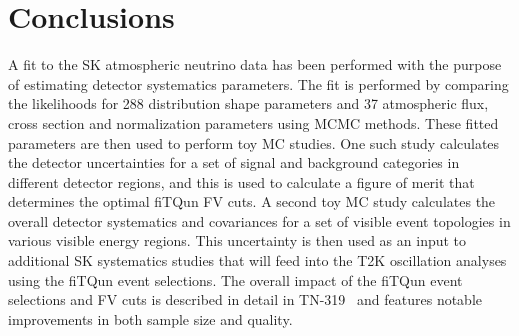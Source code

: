 
\section{Conclusions}
\label{sec:conclusions}

A fit to the SK atmospheric neutrino data has been performed with the purpose
of estimating detector systematics parameters.  The fit is performed by
comparing the likelihoods for 288 distribution shape parameters and 37
atmospheric flux, cross section and normalization parameters using MCMC
methods. These fitted parameters are then used to perform toy MC studies. One
such study calculates the detector uncertainties for a set of signal and
background categories in different detector regions, and this is used to
calculate a figure of merit that determines the optimal fiTQun FV cuts.  A
second toy MC study calculates the overall detector systematics and covariances
for a set of visible event topologies in various visible energy regions.  This
uncertainty is then used as an input to additional SK systematics studies that
will feed into the T2K oscillation analyses using the fiTQun event selections.
The overall impact of the fiTQun event selections and FV cuts is described in
detail in TN-319~\cite{tn319} and features notable improvements in both sample
size and quality.


